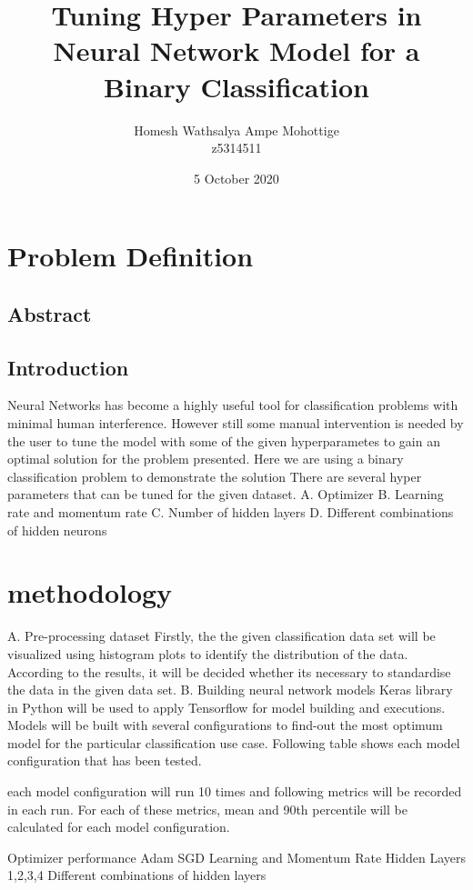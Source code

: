 \documentclass{article}
\title{Tuning Hyper Parameters in Neural Network Model for a Binary Classification}
\author{Homesh Wathsalya Ampe Mohottige \\z5314511 }
\date{5 October 2020}
\begin{document}
\maketitle
\newpage
\tableofcontents

\newpage
\section{Problem Definition}
\subsection{Abstract}
\subsection{Introduction}
Neural Networks has become a highly useful tool for classification problems\cite{JacquesEtienne} with minimal human interference. However still some manual intervention is needed by the user to tune the model with some of the given hyperparametes to gain an optimal solution for the problem presented. Here we are using a binary classification problem to demonstrate the solution
There are several hyper parameters that can be tuned for the given dataset.
A. Optimizer
B. Learning rate and momentum rate
C. Number of hidden layers
D. Different combinations of hidden neurons
\section{methodology}
A. Pre-processing dataset
Firstly, the the given classification data set will be visualized using histogram plots to identify the distribution of the data. According to the results, it will be decided whether its necessary to standardise the data in the given data set.
B. Building neural network models
Keras library in Python will be used to apply Tensorflow for model building and executions. Models will be built with several configurations to find-out the most optimum model for the particular classification use case. Following table shows each model configuration that has been tested.

each model configuration will run 10 times and following metrics will be recorded in each run. For each of these metrics, mean and 90th percentile will be calculated for each model configuration.

Optimizer performance Adam SGD
Learning and Momentum Rate
Hidden Layers 1,2,3,4
Different combinations of hidden layers
\end{document}
